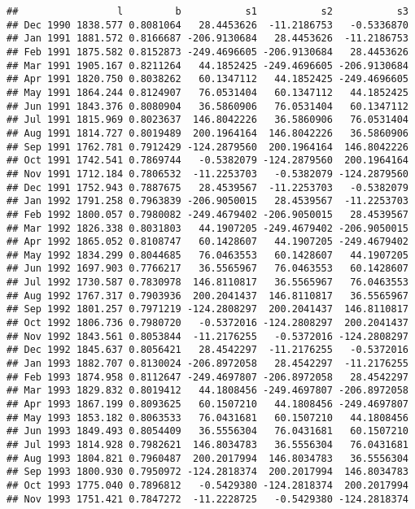 \documentclass[]{article}
\begin{document}
\begin{verbatim}
##                 l         b           s1           s2           s3
## Dec 1990 1838.577 0.8081064   28.4453626  -11.2186753   -0.5336870
## Jan 1991 1881.572 0.8166687 -206.9130684   28.4453626  -11.2186753
## Feb 1991 1875.582 0.8152873 -249.4696605 -206.9130684   28.4453626
## Mar 1991 1905.167 0.8211264   44.1852425 -249.4696605 -206.9130684
## Apr 1991 1820.750 0.8038262   60.1347112   44.1852425 -249.4696605
## May 1991 1864.244 0.8124907   76.0531404   60.1347112   44.1852425
## Jun 1991 1843.376 0.8080904   36.5860906   76.0531404   60.1347112
## Jul 1991 1815.969 0.8023637  146.8042226   36.5860906   76.0531404
## Aug 1991 1814.727 0.8019489  200.1964164  146.8042226   36.5860906
## Sep 1991 1762.781 0.7912429 -124.2879560  200.1964164  146.8042226
## Oct 1991 1742.541 0.7869744   -0.5382079 -124.2879560  200.1964164
## Nov 1991 1712.184 0.7806532  -11.2253703   -0.5382079 -124.2879560
## Dec 1991 1752.943 0.7887675   28.4539567  -11.2253703   -0.5382079
## Jan 1992 1791.258 0.7963839 -206.9050015   28.4539567  -11.2253703
## Feb 1992 1800.057 0.7980082 -249.4679402 -206.9050015   28.4539567
## Mar 1992 1826.338 0.8031803   44.1907205 -249.4679402 -206.9050015
## Apr 1992 1865.052 0.8108747   60.1428607   44.1907205 -249.4679402
## May 1992 1834.299 0.8044685   76.0463553   60.1428607   44.1907205
## Jun 1992 1697.903 0.7766217   36.5565967   76.0463553   60.1428607
## Jul 1992 1730.587 0.7830978  146.8110817   36.5565967   76.0463553
## Aug 1992 1767.317 0.7903936  200.2041437  146.8110817   36.5565967
## Sep 1992 1801.257 0.7971219 -124.2808297  200.2041437  146.8110817
## Oct 1992 1806.736 0.7980720   -0.5372016 -124.2808297  200.2041437
## Nov 1992 1843.561 0.8053844  -11.2176255   -0.5372016 -124.2808297
## Dec 1992 1845.637 0.8056421   28.4542297  -11.2176255   -0.5372016
## Jan 1993 1882.707 0.8130024 -206.8972058   28.4542297  -11.2176255
## Feb 1993 1874.958 0.8112647 -249.4697807 -206.8972058   28.4542297
## Mar 1993 1829.832 0.8019412   44.1808456 -249.4697807 -206.8972058
## Apr 1993 1867.199 0.8093625   60.1507210   44.1808456 -249.4697807
## May 1993 1853.182 0.8063533   76.0431681   60.1507210   44.1808456
## Jun 1993 1849.493 0.8054409   36.5556304   76.0431681   60.1507210
## Jul 1993 1814.928 0.7982621  146.8034783   36.5556304   76.0431681
## Aug 1993 1804.821 0.7960487  200.2017994  146.8034783   36.5556304
## Sep 1993 1800.930 0.7950972 -124.2818374  200.2017994  146.8034783
## Oct 1993 1775.040 0.7896812   -0.5429380 -124.2818374  200.2017994
## Nov 1993 1751.421 0.7847272  -11.2228725   -0.5429380 -124.2818374

\end{verbatim}
\end{document}
